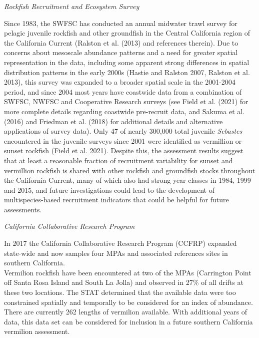 \documentclass[11pt,
  english,
]{article}
\begin{document}
\emph{Rockfish Recruitment and Ecosystem Survey}

Since 1983, the SWFSC has conducted an annual midwater trawl survey for pelagic juvenile rockfish and other groundfish in the Central California region of the California Current (Ralston et al. {(2013)\leavevmode\tagmcend\tagstructend} and references therein). Due to concerns about mesoscale abundance patterns and a need for greater spatial representation in the data, including some apparent strong differences in spatial distribution patterns in the early 2000s {(Hastie and Ralston 2007, Ralston et al. 2013)\leavevmode\tagmcend\tagstructend}, this survey was expanded to a broader spatial scale in the 2001-2004 period, and since 2004 most years have coastwide data from a combination of SWFSC, NWFSC and Cooperative Research surveys (see Field et al. {(2021)\leavevmode\tagmcend\tagstructend} for more complete details regarding coastwide pre-recruit data, and Sakuma et al. {(2016)\leavevmode\tagmcend\tagstructend} and Friedman et al. {(2018)\leavevmode\tagmcend\tagstructend} for additional details and alternative applications of survey data). Only 47 of nearly 300,000 total juvenile \emph{Sebastes} encountered in the juvenile surveys since 2001 were identified as vermillion or sunset rockfish {(Field et al. 2021)\leavevmode\tagmcend\tagstructend}. Despite this, the assessment results suggest that at least a reasonable fraction of recruitment variability for sunset and vermillion rockfish is shared with other rockfish and groundfish stocks throughout the California Current, many of which also had strong year classes in 1984, 1999 and 2015, and future investigations could lead to the development of multispecies-based recruitment indicators that could be helpful for future assessments.

\emph{California Collaborative Research Program}

In 2017 the California Collaborative Research Program (CCFRP) expanded state-wide and now samples four MPAs and associated references sites in southern California.\\
Vermilion rockfish have been encountered at two of the MPAs (Carrington Point off Santa Rosa Island and South La Jolla) and observed in 27\% of all drifts at these two locations. The STAT determined that the available data were too constrained spatially and temporally to be considered for an index of abundance. There are currently 262 lengths of vermilion available. With additional years of data, this data set can be considered for inclusion in a future southern California vermilion assessment.
\end{document}
